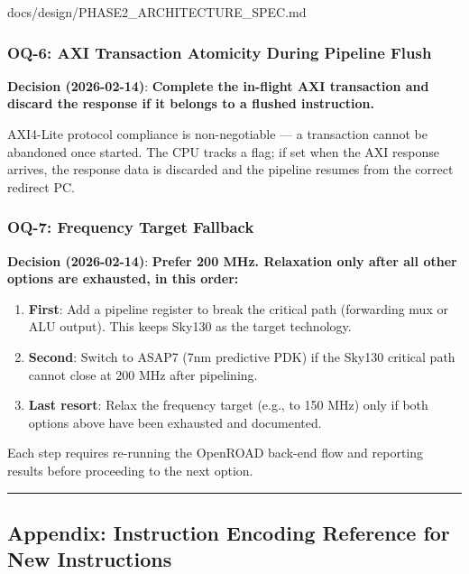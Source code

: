 \begin{relocated}{docs/design/PHASE2_ARCHITECTURE_SPEC.md}
\subsubsection{OQ-6: AXI Transaction Atomicity During Pipeline Flush}\label{ds:ch:phase2-architecture:oq-6-axi-transaction-atomicity-during-pipeline-flush}

\textbf{Decision (2026-02-14)}: \ok{} \textbf{Complete the in-flight AXI
transaction and discard the response if it belongs to a flushed
instruction.}

AXI4-Lite protocol compliance is non-negotiable --- a transaction cannot
be abandoned once started. The CPU tracks a  flag;
if set when the AXI response arrives, the response data is discarded and
the pipeline resumes from the correct redirect PC.

\subsubsection{OQ-7: Frequency Target Fallback}\label{ds:ch:phase2-architecture:oq-7-frequency-target-fallback}

\textbf{Decision (2026-02-14)}: \ok{} \textbf{Prefer 200 MHz. Relaxation
only after all other options are exhausted, in this order:}

\begin{enumerate}
\def\labelenumi{\arabic{enumi}.}
\tightlist
\item
  \textbf{First}: Add a pipeline register to break the critical path
  (forwarding mux or ALU output). This keeps Sky130 as the target
  technology.
\item
  \textbf{Second}: Switch to ASAP7 (7nm predictive PDK) if the Sky130
  critical path cannot close at 200 MHz after pipelining.
\item
  \textbf{Last resort}: Relax the frequency target (e.g., to 150 MHz)
  only if both options above have been exhausted and documented.
\end{enumerate}

Each step requires re-running the OpenROAD back-end flow and reporting
results before proceeding to the next option.

\begin{center}\rule{0.5\linewidth}{0.5pt}\end{center}

\subsection{Appendix: Instruction Encoding Reference for New
Instructions}\label{ds:ch:phase2-architecture:11-appendix-instruction-encoding-reference-for-new-instructions}


\end{relocated}

